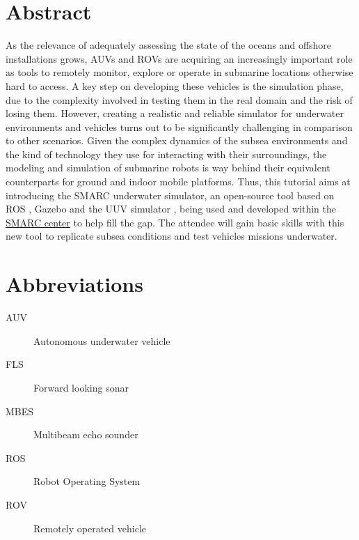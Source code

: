 \documentclass[
10pt, %
a4paper, %
oneside, %
BCOR5mm, %
]{scrartcl}
\begin{document}
\section*{Abstract} 
As the relevance of adequately assessing the state of the oceans and offshore installations grows, AUVs and ROVs are acquiring an increasingly important role as tools to remotely monitor, explore or operate in submarine locations otherwise hard to access.
A key step on developing these vehicles is the simulation phase, due to the complexity involved in testing them in the real domain and the risk of losing them.
However, creating a realistic and reliable simulator for underwater environments and vehicles turns out to be significantly challenging in comparison to other scenarios.
Given the complex dynamics of the subsea environments and the kind of technology they use for interacting with their surroundings, the modeling and simulation of submarine robots is way behind their equivalent counterparts for ground and indoor mobile platforms.
Thus, this tutorial aims at introducing the SMARC underwater simulator, an open-source tool based on ROS \cite{Quigley09}, Gazebo \cite{koenig2004design} and the UUV simulator \cite{Manhaes_2016}, being used and developed within the \href{https://smarc.se/}{SMARC center} to help fill the gap. 
The attendee will gain basic skills with this new tool to replicate subsea conditions and test vehicles missions underwater.


\section{Abbreviations}
\label{sec:abbreviations}
\begin{description}
\item [AUV] Autonomous underwater vehicle
\item [FLS] Forward looking sonar
\item [MBES] Multibeam echo sounder
\item [ROS] Robot Operating System
\item [ROV] Remotely operated vehicle
\end{description}


\end{document}
